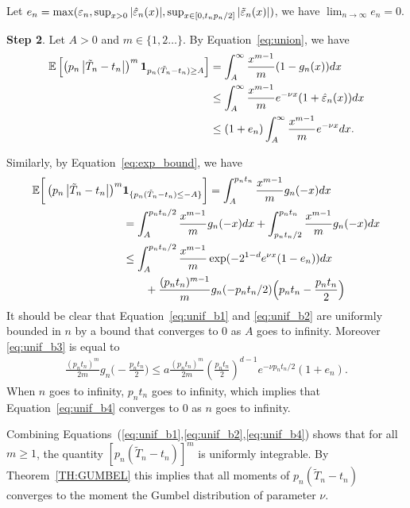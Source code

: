 \documentclass{aptpub}
\newcommand\expect[1]{\mathchoice{\bexpect{#1}}{\sexpect{#1}}{\sexpect{#1}}{\sexpect{#1}}}
\newcommand\bexpect[1]{\mathbb{E}\left[#1\right]}
\newcommand\sexpect[1]{\mathbb{E}[#1]}
\newcommand\abs[1]{\mathchoice{\babs{#1}}{\sabs{#1}}{\sabs{#1}}{\sabs{#1}}}
\newcommand\babs[1]{\left|#1\right|}
\newcommand\sabs[1]{|#1|}
\newcommand\p[1]{\left(#1\right)}
\begin{document}
  Let
  $e_n =
  \max(\varepsilon_n,\sup_{x>0}\abs{\hat\varepsilon_n(x)},\sup_{x\in[0,t_np_n/2]}\abs{\tilde\varepsilon_n(x)})$,
  we have $\lim_{n\to\infty}e_n=0$.

  \textbf{Step 2}. Let $A>0$ and $m\in\{1,2\dots\}$.  By
  Equation~\eqref{eq:union}, we have
  \begin{align}
    \expect{\left(p_n\abs{\tilde T_n-t_n}\right)^m\mathbf{1}_{p_n(\tilde T_n-t_n)\ge A}}
    &= \int_{A}^\infty \frac{x^{m-1}}{m} (1-g_n(x))dx \nonumber\\
    &\le \int_{A}^\infty \frac{x^{m-1}}{m} e^{-\nu x}
      (1+\hat\varepsilon_n(x))dx\nonumber\\
    &\le (1+e_n)\int_{A}^\infty \frac{x^{m-1}}{m} e^{-\nu x} dx.\label{eq:unif_b1}
  \end{align}

  Similarly, by Equation~\eqref{eq:exp_bound}, we have
  \begin{align}
    \mathbb{E}\bigg[\left(p_n\abs{\tilde T_n-t_n}\right)^m&\mathbf{1}_{\{p_n(\tilde T_n-t_n)\le -A\}}\bigg]
      = \int_{A}^{p_nt_n} \frac{x^{m-1}}{m} g_n(-x)dx \nonumber\\
    &= \int_{A}^{p_nt_n/2} \frac{x^{m-1}}{m} g_n(-x)dx
     +\int_{p_nt_n/2}^{p_nt_n} \frac{x^{m-1}}{m} g_n(-x)dx \nonumber\\
    &\le \int_{A}^{p_nt_n/2} \frac{x^{m-1}}{m} \exp(-2^{1-d}e^{\nu
      x}(1-e_n))dx
    \label{eq:unif_b2}\\
    &\qquad+\frac{(p_nt_n)^{m-1}}{m} g_n(-p_nt_n/2)\Big(p_nt_n-\frac{p_nt_n}{2}\Big)\label{eq:unif_b3}
  \end{align}
  It should be clear that Equation~\eqref{eq:unif_b1} and
  \eqref{eq:unif_b2} are uniformly bounded in $n$ by a bound that
  converges to $0$ as $A$ goes to infinity. Moreover
  \eqref{eq:unif_b3} is equal to
  \begin{align}
    \frac{(p_nt_n)^{m}}{2m} g_n\Big(-\frac{p_nt_n}{2}\Big)\le
    a\frac{(p_nt_n)^{m}}{2m}\p{\frac{p_nt_n}{2}}^{d-1}e^{-\nu p_n
    t_n/2}(1+e_n). 
    \label{eq:unif_b4}
  \end{align}
  When $n$ goes to infinity, $p_nt_n$ goes to infinity, which implies
  that Equation~\eqref{eq:unif_b4} converges to $0$ as $n$ goes to
  infinity.
  
  Combining
  Equations~(\ref{eq:unif_b1},\ref{eq:unif_b2},\ref{eq:unif_b4}) shows
  that for all $m\ge1$, the quantity $[p_n(\tilde T_n-t_n)]^m$ is
  uniformly integrable. By Theorem~\ref{TH:GUMBEL} this implies that
  all moments of $p_n(\tilde T_n-t_n)$ converges to the moment the
  Gumbel distribution of parameter $\nu$. 
  
\end{document}

